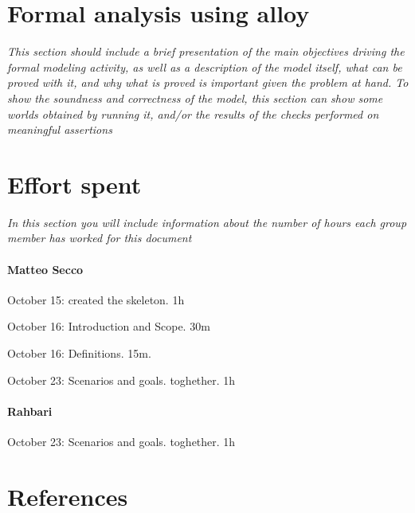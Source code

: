 \documentclass{article}
\begin{document}
\section{Formal analysis using alloy} \textit{This section should include a brief presentation of the main objectives driving the formal modeling activity, as well as a description of the model itself, what can be proved with it, and why what is proved is important given the problem at hand. To show the soundness and correctness of the model, this section can show some worlds obtained by running it, and/or the results of the checks performed on meaningful assertions}
\section{Effort spent} \textit{In this section you will include information about the number of hours each group member has worked for this document}
	\paragraph{Matteo Secco} 
		\begin{list}{-}{}
			\item October 15: created the skeleton. 1h
			\item October 16: Introduction and Scope. 30m
			\item October 16: Definitions. 15m.
			\item October 23: Scenarios and goals. toghether. 1h
		\end{list}
	\paragraph{Rahbari}
		\begin{list}{-}{}
			\item October 23: Scenarios and goals. toghether. 1h
		\end{list}
\section{References}
\end{document}
